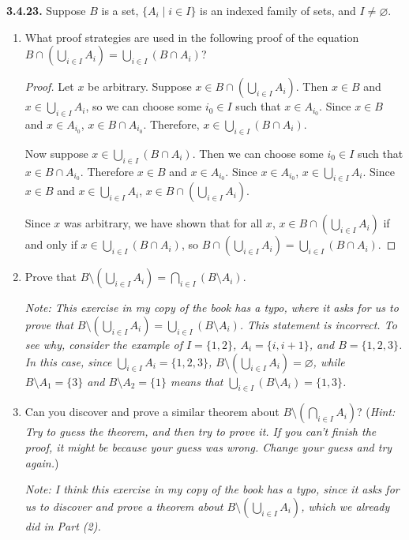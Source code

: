 \documentclass[12pt]{amsart}
\newenvironment{statement}[1]{\smallskip\noindent\color[rgb]{.6627, .3529, .6314} {\bf #1.}}{}
\theoremstyle{definition}
\theoremstyle{remark}
\begin{document}
\begin{statement}{3.4.23}
Suppose $B$ is a set, $\{ A_i \mid i \in I \}$ is an indexed family of sets, and $I \neq \varnothing$.
\begin{enumerate}
	\item What proof strategies are used in the following proof of the equation
	$B \cap \left( \bigcup_{i \in I} A_i \right) = \bigcup_{i \in I} (B \cap A_i)$?
	\begin{proof}
		Let $x$ be arbitrary.
		Suppose $x \in B \cap \left( \bigcup_{i \in I} A_i \right)$.
		Then $x \in B$ and $x \in \bigcup_{i \in I} A_i$,
		so we can choose some $i_0 \in I$ such that $x \in A_{i_0}$.
		Since $x \in B$ and $x \in A_{i_0}$, $x \in B \cap A_{i_0}$.
		Therefore, $x \in \bigcup_{i \in I} (B \cap A_i)$.
		
		Now suppose $x \in \bigcup_{i \in I} (B \cap A_i)$.
		Then we can choose some $i_0 \in I$ such that $x \in B \cap A_{i_0}$.
		Therefore $x \in B$ and $x \in A_{i_0}$.
		Since $x \in A_{i_0}$, $x \in \bigcup_{i \in I} A_i$.
		Since $x \in B$ and $x \in \bigcup_{i \in I} A_i$,
		$x \in B \cap \left( \bigcup_{i \in I} A_i \right)$.
		
		Since $x$ was arbitrary, we have shown that for all $x$,
		$x \in B \cap \left( \bigcup_{i \in I} A_i \right)$ if and only if
		$x \in \bigcup_{i \in I} (B \cap A_i)$, so
		$B \cap \left( \bigcup_{i \in I} A_i \right) = \bigcup_{i \in I} (B \cap A_i)$.
	\end{proof}
	
	\item Prove that $B \setminus \left( \bigcup_{i \in I} A_i \right) = 
	\bigcap_{i \in I} (B \setminus A_i)$.
	
	\emph{
	Note: This exercise in my copy of the book has a typo, where it asks for us to prove that
	$B \setminus \left( \bigcup_{i \in I} A_i \right) = \bigcup_{i \in I} (B \setminus A_i)$.
	This statement is incorrect.
	To see why, consider the example of 
	$I = \{ 1, 2 \}$, $A_i = \{ i, i + 1 \}$, and $B = \{ 1, 2, 3 \}$.
	In this case, since $\bigcup_{i \in I} A_i = \{ 1, 2, 3 \}$,
	$B \setminus \left( \bigcup_{i \in I} A_i \right) = \varnothing$,
	while $B \setminus A_1 = \{ 3 \}$ and $B \setminus A_2 = \{ 1 \}$ means that
	$\bigcup_{i \in I} (B \setminus A_i) = \{ 1, 3 \}$.
	}
	
	\item Can you discover and prove a similar theorem about
	$B \setminus \left( \bigcap_{i \in I} A_i \right)$?
	(\emph{Hint: Try to guess the theorem, and then try to prove it.
	If you can't finish the proof, it might be because your guess was wrong.
	Change your guess and try again.})
	
	\emph{Note: I think this exercise in my copy of the book has a typo, since it asks for
	us to discover and prove a theorem about $B \setminus \left( \bigcup_{i \in I} A_i \right)$,
	which we already did in Part (2).}
\end{enumerate}
\end{statement}
\end{document}
